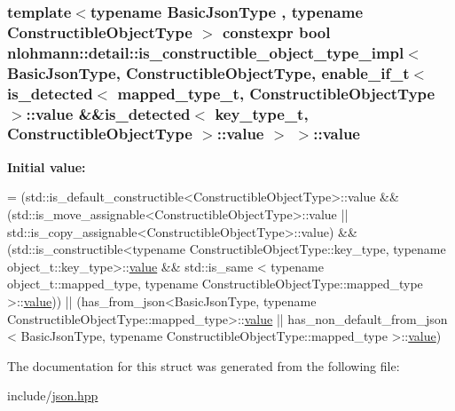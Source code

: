 \subsubsection[{\texorpdfstring{value}{value}}]{\setlength{\rightskip}{0pt plus 5cm}template$<$typename Basic\+Json\+Type , typename Constructible\+Object\+Type $>$ constexpr bool {\bf nlohmann\+::detail\+::is\+\_\+constructible\+\_\+object\+\_\+type\+\_\+impl}$<$ Basic\+Json\+Type, Constructible\+Object\+Type, {\bf enable\+\_\+if\+\_\+t}$<$ {\bf is\+\_\+detected}$<$ {\bf mapped\+\_\+type\+\_\+t}, Constructible\+Object\+Type $>$\+::value \&\&{\bf is\+\_\+detected}$<$ {\bf key\+\_\+type\+\_\+t}, Constructible\+Object\+Type $>$\+::value $>$ $>$\+::value\hspace{0.3cm}{\ttfamily [static]}}\hypertarget{structnlohmann_1_1detail_1_1is__constructible__object__type__impl_3_01BasicJsonType_00_01Construa4d1e16800f2c4963485512ecf18377c_a50418a0a88d63afbf7246af49f3e554c}{}\label{structnlohmann_1_1detail_1_1is__constructible__object__type__impl_3_01BasicJsonType_00_01Construa4d1e16800f2c4963485512ecf18377c_a50418a0a88d63afbf7246af49f3e554c}
{\bfseries Initial value\+:}
\begin{DoxyCode}
=
        (std::is\_default\_constructible<ConstructibleObjectType>::value &&
         (std::is\_move\_assignable<ConstructibleObjectType>::value ||
          std::is\_copy\_assignable<ConstructibleObjectType>::value) &&
         (std::is\_constructible<\textcolor{keyword}{typename} ConstructibleObjectType::key\_type,
          \textcolor{keyword}{typename} object\_t::key\_type>::\hyperlink{structnlohmann_1_1detail_1_1is__constructible__object__type__impl_3_01BasicJsonType_00_01Construa4d1e16800f2c4963485512ecf18377c_a50418a0a88d63afbf7246af49f3e554c}{value} &&
          std::is\_same <
          \textcolor{keyword}{typename} object\_t::mapped\_type,
          \textcolor{keyword}{typename} ConstructibleObjectType::mapped\_type >::\hyperlink{structnlohmann_1_1detail_1_1is__constructible__object__type__impl_3_01BasicJsonType_00_01Construa4d1e16800f2c4963485512ecf18377c_a50418a0a88d63afbf7246af49f3e554c}{value})) ||
        (has\_from\_json<BasicJsonType,
         \textcolor{keyword}{typename} ConstructibleObjectType::mapped\_type>::\hyperlink{structnlohmann_1_1detail_1_1is__constructible__object__type__impl_3_01BasicJsonType_00_01Construa4d1e16800f2c4963485512ecf18377c_a50418a0a88d63afbf7246af49f3e554c}{value} ||
         has\_non\_default\_from\_json <
         BasicJsonType,
         \textcolor{keyword}{typename} ConstructibleObjectType::mapped\_type >::\hyperlink{structnlohmann_1_1detail_1_1is__constructible__object__type__impl_3_01BasicJsonType_00_01Construa4d1e16800f2c4963485512ecf18377c_a50418a0a88d63afbf7246af49f3e554c}{value})
\end{DoxyCode}


The documentation for this struct was generated from the following file\+:\begin{DoxyCompactItemize}
\item 
include/\hyperlink{json_8hpp}{json.\+hpp}\end{DoxyCompactItemize}

